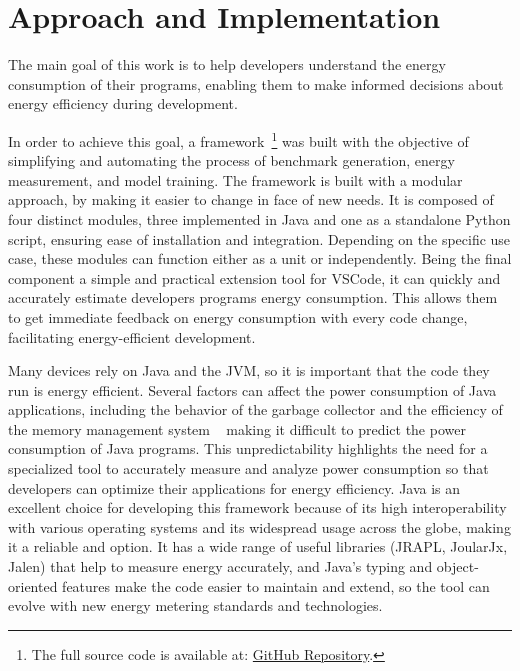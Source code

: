 \chapter{Approach and Implementation}\label{chapter:approach}



The main goal of this work is to help developers understand the energy consumption of their programs, enabling them to make informed decisions about energy efficiency during development.

In order to achieve this goal, a framework~\footnote{The full source code is available at: \href{https://github.com/afonsoCarreira1/EnergyAwareProgramming}{GitHub Repository}.} was built with the objective of simplifying and automating the process of benchmark generation, energy measurement, and model training. The framework is built with a modular approach, by making it easier to change in face of new needs. It is composed of four distinct modules, three implemented in Java and one as a standalone Python script, ensuring ease of installation and integration. Depending on the specific use case, these modules can function either as a unit or independently. Being the final component a simple and practical extension tool for VSCode, it can quickly and accurately estimate developers programs energy consumption. This allows them to get immediate feedback on energy consumption with every code change, facilitating energy-efficient development.




Many devices rely on Java and the JVM, so it is important that the code they run is energy efficient. Several factors can affect the power consumption of Java applications, including the behavior of the garbage collector and the efficiency of the memory management system ~\cite{10.5555/1267847.1267870} making it difficult to predict the power consumption of Java programs. This unpredictability highlights the need for a specialized tool to accurately measure and analyze power consumption so that developers can optimize their applications for energy efficiency.
Java is an excellent choice for developing this framework because of its high interoperability with various operating systems and its widespread usage across the globe, making it a reliable and option. It has a wide range of useful libraries (JRAPL, JoularJx, Jalen) that help to measure energy accurately, and Java's typing and object-oriented features make the code easier to maintain and extend, so the tool can evolve with new energy metering standards and technologies.

